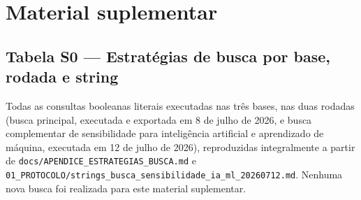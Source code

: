 \section*{Material suplementar}

\clearpage
\subsection*{Tabela S0 --- Estratégias de busca por base, rodada e string}

Todas as consultas booleanas literais executadas nas três bases, nas duas rodadas (busca principal, executada e exportada em 8 de julho de 2026, e busca complementar de sensibilidade para inteligência artificial e aprendizado de máquina, executada em 12 de julho de 2026), reproduzidas integralmente a partir de \nolinkurl{docs/APENDICE_ESTRATEGIAS_BUSCA.md} e \nolinkurl{01_PROTOCOLO/strings_busca_sensibilidade_ia_ml_20260712.md}. Nenhuma nova busca foi realizada para este material suplementar.

